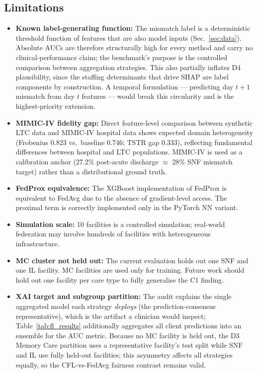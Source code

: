 \documentclass[journal]{IEEEtran}
\begin{document}
\subsection{Limitations}
\begin{itemize}
  \item \textbf{Known label-generating function:} The mismatch label is a
  deterministic threshold function of features that are also model inputs
  (Sec.~\ref{sec:data}). Absolute AUCs are therefore structurally high for every
  method and carry no clinical-performance claim; the benchmark's purpose is the
  controlled comparison between aggregation strategies. This also partially
  inflates D4 plausibility, since the staffing determinants that drive SHAP are
  label components by construction. A temporal formulation --- predicting day
  $t{+}1$ mismatch from day $t$ features --- would break this circularity and is
  the highest-priority extension.
  \item \textbf{MIMIC-IV fidelity gap:} Direct feature-level comparison between
  synthetic LTC data and MIMIC-IV hospital data shows expected domain heterogeneity
  (Frobenius 0.823 vs.\ baseline 0.746; TSTR gap 0.333), reflecting fundamental
  differences between hospital and LTC populations. MIMIC-IV is used as a
  calibration anchor (27.2\% post-acute discharge $\approx$ 28\% SNF mismatch
  target) rather than a distributional ground truth.
  \item \textbf{FedProx equivalence:} The XGBoost implementation of FedProx is
  equivalent to FedAvg due to the absence of gradient-level access. The proximal
  term is correctly implemented only in the PyTorch NN variant.
  \item \textbf{Simulation scale:} 10 facilities is a controlled simulation;
  real-world federation may involve hundreds of facilities with heterogeneous
  infrastructure.
  \item \textbf{MC cluster not held out:} The current evaluation holds out one SNF
  and one IL facility. MC facilities are used only for training. Future work should
  hold out one facility per care type to fully generalise the C1 finding.
  \item \textbf{XAI target and subgroup partition:} The audit explains the single
  aggregated model each strategy \emph{deploys} (the prediction-consensus
  representative), which is the artifact a clinician would inspect; Table~\ref{tab:fl_results}
  additionally aggregates all client predictions into an ensemble for the AUC metric.
  Because no MC facility is held out, the D3 Memory Care partition uses a
  representative facility's test split while SNF and IL use fully held-out
  facilities; this asymmetry affects all strategies equally, so the CFL-vs-FedAvg
  fairness contrast remains valid.
\end{itemize}
\end{document}
